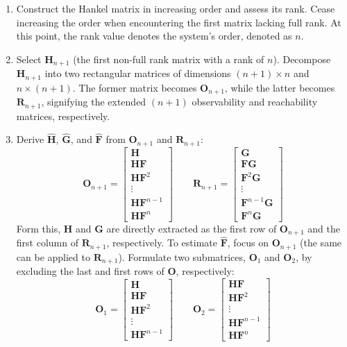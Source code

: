 \begin{enumerate}
    \item Construct the Hankel matrix in increasing order and assess its rank. 
        Cease increasing the order when encountering the first matrix lacking full rank.
        At this point,  the rank value denotes the system's order, denoted as $n$.
    \item Select $\mathbf{H}_{n+1}$ (the first non-full rank matrix with a rank of $n$). 
        Decompose $\mathbf{H}_{n+1}$  into two rectangular matrices of dimensions $(n+1) \times n$ and $n \times (n+1)$.
        The former matrix becomes $\mathbf{O}_{n+1}$, while the latter becomes $\mathbf{R}_{n+1}$, signifying the extended $(n+1)$ observability and reachability matrices, respectively.
    \item Derive $\hat{\mathbf{H}}$, $\hat{\mathbf{G}}$, and $\hat{\mathbf{F}}$ from $\mathbf{O}_{n+1}$ and $\mathbf{R}_{n+1}$: 
        \[\mathbf{O}_{n+1}=\begin{bmatrix} \mathbf{H} \\ \mathbf{HF} \\ \mathbf{HF}^2 \\ \vdots \\ \mathbf{HF}^{n-1} \\ \mathbf{HF}^{n} \end{bmatrix} \qquad \mathbf{R}_{n+1}=\begin{bmatrix} \mathbf{G} \\ \mathbf{FG} \\ \mathbf{F}^2\mathbf{G} \\ \vdots \\ \mathbf{F}^{n-1}\mathbf{G} \\ \mathbf{F}^{n}\mathbf{G} \end{bmatrix}\]
        Form this, $\mathbf{H}$ and $\mathbf{G}$ are directly extracted as the first row of $\mathbf{O}_{n+1}$ and the first column of $\mathbf{R}_{n+1}$, respectively. 
        To estimate $\hat{\mathbf{F}}$, focus on $\mathbf{O}_{n+1}$ (the same can be applied to $\mathbf{R}_{n+1}$). 
        Formulate two submatrices, $\mathbf{O}_1$ and $\mathbf{O}_2$, by excluding the last and first rows of $\mathbf{O}$, respectively:
        \[\mathbf{O}_{1}=\begin{bmatrix} \mathbf{H} \\ \mathbf{HF} \\ \mathbf{HF}^2 \\ \vdots \\ \mathbf{HF}^{n-1} \end{bmatrix} \qquad \mathbf{O}_{2}=\begin{bmatrix} \mathbf{HF} \\ \mathbf{HF}^2 \\ \vdots \\ \mathbf{HF}^{n-1} \\ \mathbf{HF}^{n} \end{bmatrix}\]

\end{enumerate}
